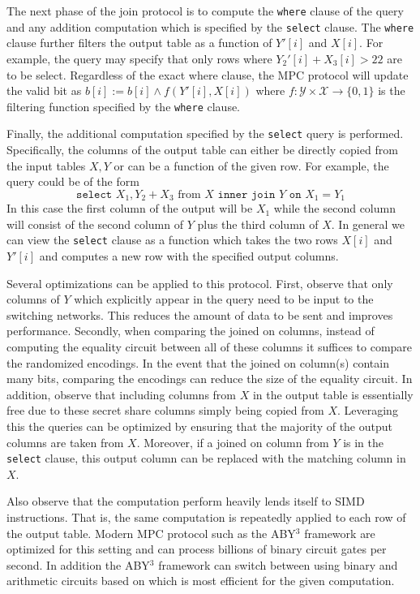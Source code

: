 The next phase of the join protocol is to compute the \texttt{where} clause of the query and any addition computation which is specified by the \texttt{select} clause. The \texttt{where} clause further filters the output table as a function of $Y'[i]$ and $X[i]$. For example, the query may specify that only rows where $Y_2'[i] + X_3[i] > 22$  are to be select. Regardless of the exact where clause, the MPC protocol will update the valid bit as $b[i] := b[i] \wedge f(Y'[i], X[i])$ where $f: \mathcal{Y}\times \mathcal{X} \rightarrow \{0,1\}$ is the filtering function specified by the \texttt{where} clause.

Finally, the additional computation specified by the \texttt{select} query is performed. Specifically, the columns of the output table can either be directly copied from the input tables $X,Y$ or can be a function of the given row. For example, the query could be of the form 
$$
\texttt{select } X_1, Y_2 + X_3 \text{ from } X \texttt{ inner join } Y \texttt{ on } X_1 = Y_1
$$
In this case the first column of the output will be $X_1$ while the second column will consist of the second column of $Y$ plus the third column of $X$. In general we can view the \texttt{select} clause as a function which takes the two rows $X[i]$ and $Y'[i]$ and computes a new row with the specified output columns. 

Several optimizations can be applied to this protocol. First, observe that only columns of $Y$ which explicitly appear in the query need to be input to the switching networks. This reduces the amount of data to be sent and improves performance. Secondly, when comparing the joined on columns, instead of computing the equality circuit between all of these columns it suffices to compare the randomized encodings. In the event that the joined on column(s) contain many bits, comparing the encodings can reduce the size of the equality circuit. In addition, observe that including columns from $X$ in the output table is essentially free due to these secret share columns simply being copied from $X$. Leveraging this the queries can be optimized by ensuring that the majority of the output columns are taken from $X$. Moreover, if a joined on column from $Y$ is in the \texttt{select} clause, this output column can be replaced with the matching column in $X$.

Also observe that the computation perform heavily lends itself to SIMD instructions. That is, the same computation is repeatedly applied to each row of the output table. Modern MPC protocol such as the ABY$^3$ framework \cite{aby3,highthroughput} are optimized for this setting and can process billions of binary circuit gates per second\cite{highthroughput}. In addition the ABY$^3$ framework can switch between using binary and arithmetic circuits based on which is most efficient for the given computation. 

